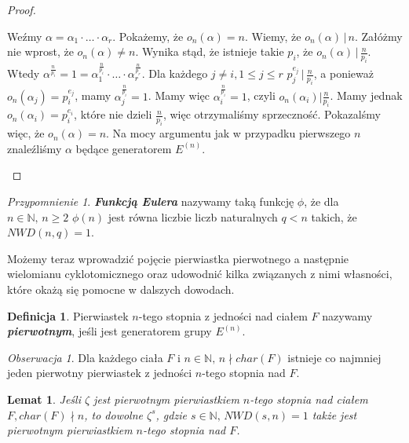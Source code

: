 \documentclass[polish,declaration,shortabstract]{iithesis}
\theoremstyle{definition}
\newtheorem{definition}{Definicja}
\theoremstyle{remark} \newtheorem{observation}{Obserwacja}
\theoremstyle{plain} \newtheorem{theorem}{Twierdzenie}
\theoremstyle{plain} \newtheorem{lemma}{Lemat}
\theoremstyle{remark} \newtheorem*{remark*}{Uwaga}
\theoremstyle{reminder} \newtheorem*{reminder*}{Przypomnienie}
\begin{document}
\begin{proof}
\begin{enumerate}[label=(\arabic*),leftmargin=.4in]
\begin{enumerate}[label=(3.\arabic*)]
		      	      Weźmy $\alpha = \alpha_1 \cdot \dots \cdot \alpha_r$. Pokażemy, że $o_n(\alpha) = n$. Wiemy, że $o_n(\alpha) \, | \, n$. Załóżmy nie wprost, że $o_n(\alpha) \neq n$. Wynika stąd, że istnieje takie $p_i$, że $o_n(\alpha) \, | \, \frac{n}{p_i}$. Wtedy $\alpha^{\frac{n}{p_i}} = 1 = \alpha_1^{\frac{n}{p_i}} \cdot \dots \cdot \alpha_r^{\frac{n}{p_r}}$. Dla każdego $j \neq i, 1 \leq j \leq r$ $p_j^{e_j} \, | \, \frac{n}{p_i}$, a ponieważ $o_n(\alpha_j) = p_i^{e_j}$, mamy $\alpha_j^{\frac{n}{p_i}} = 1$. Mamy więc $\alpha_i^{\frac{n}{p_i}} = 1$, czyli $o_n(\alpha_i) | \frac{n}{p_i}$. Mamy jednak $o_n(\alpha_i) = p_i^{e_i}$, które nie dzieli $\frac{n}{p_i}$, więc otrzymaliśmy sprzeczność. Pokazalśmy więc, że $o_n(\alpha) = n$. Na mocy argumentu jak w przypadku pierwszego $n$ znaleźliśmy $\alpha$ będące generatorem $E^{(n)}$.
		      \end{enumerate}
	\end{enumerate}
\end{proof}
    

\begin{reminder*}
	\textbf{\textit{Funkcją Eulera}} nazywamy taką funkcję $\phi$, że dla $n \in \mathbb{N}, \, n \geq 2$ $\phi(n)$ jest równa liczbie liczb naturalnych $q < n$ takich, że $NWD(n, q) = 1$. 
\end{reminder*}

Możemy teraz wprowadzić pojęcie pierwiastka pierwotnego a następnie wielomianu cyklotomicznego oraz udowodnić kilka związanych z nimi własności, które okażą się pomocne w dalszych dowodach.

\begin{definition}
	Pierwiastek $n$-tego stopnia z jedności nad ciałem $F$ nazywamy \textbf{\textit{pierwotnym}}, jeśli jest generatorem grupy $E^{(n)}$.
\end{definition}
	
\begin{observation}
	Dla każdego ciała $F$ i $n \in \mathbb{N}, \, n \nmid char(F)$  istnieje co najmniej jeden pierwotny pierwiastek z jedności $n$-tego stopnia nad $F$.
\end{observation}
	
\begin{lemma}\label{pierwotne}
	Jeśli $\zeta$ jest pierwotnym pierwiastkiem $n$-tego stopnia nad ciałem $F, char(F) \nmid n$, to dowolne $\zeta^s$, gdzie $s \in \mathbb{N}, \, NWD(s, n) = 1$ także jest pierwotnym pierwiastkiem $n$-tego stopnia nad $F$.
\end{lemma}
	
\end{document}
